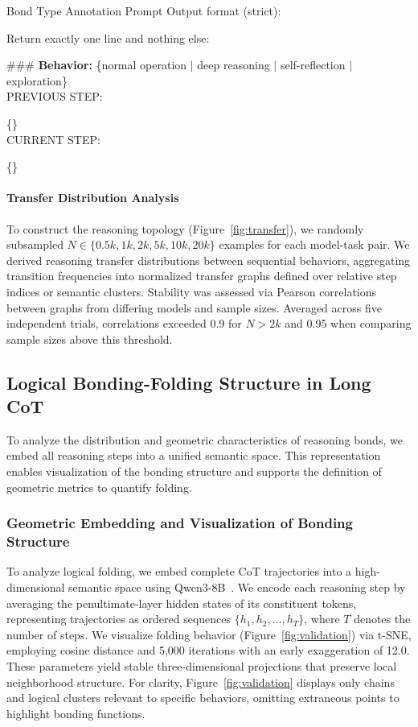 \begin{PromptBox}{Bond Type Annotation Prompt}
Output format (strict):

Return exactly one line and nothing else:

\#\#\# \textbf{Behavior:} \{normal operation $|$ deep reasoning $|$ self-reflection $|$ exploration\}
\\

PREVIOUS STEP:

\{\}\\

CURRENT STEP:

\{\}
\end{PromptBox}


\paragraph{\textbf{Transfer Distribution Analysis}}
\label{app:stable-bond-stability}
To construct the reasoning topology (Figure~\ref{fig:transfer}), we randomly subsampled \(N \in \{0.5k, 1k, 2k, 5k, 10k, 20k\}\) examples for each model-task pair. We derived reasoning transfer distributions between sequential behaviors, aggregating transition frequencies into normalized transfer graphs defined over relative step indices or semantic clusters. Stability was assessed via Pearson correlations between graphs from differing models and sample sizes. Averaged across five independent trials, correlations exceeded 0.9 for \(N > 2k\) and 0.95 when comparing sample sizes above this threshold.

\subsection{Logical Bonding-Folding Structure in Long CoT}
\label{app:folding}
To analyze the distribution and geometric characteristics of reasoning bonds, we embed all reasoning steps into a unified semantic space. This representation enables visualization of the bonding structure and supports the definition of geometric metrics to quantify folding.

\subsubsection{Geometric Embedding and Visualization of Bonding Structure}
To analyze {logical folding}, we embed complete CoT trajectories into a high-dimensional semantic space using Qwen3-8B~\citep{yang2025qwen3}. We encode each reasoning step by averaging the penultimate-layer hidden states of its constituent tokens, representing trajectories as ordered sequences \(\{h_1, h_2, \ldots, h_T\}\), where \(T\) denotes the number of steps.
We visualize folding behavior (Figure~\ref{fig:validation}) via t-SNE, employing cosine distance and 5,000 iterations with an early exaggeration of 12.0. These parameters yield stable three-dimensional projections that preserve local neighborhood structure. For clarity, Figure~\ref{fig:validation} displays only chains and logical clusters relevant to specific behaviors, omitting extraneous points to highlight bonding functions.

